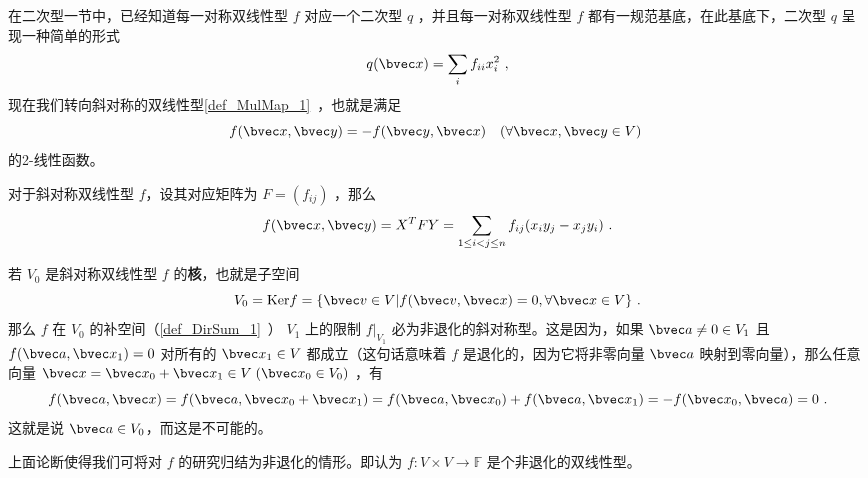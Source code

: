 
在二次型一节中，已经知道每一对称双线性型 $f$ 对应一个二次型 $q$ ，并且每一对称双线性型 $f$ 都有一规范基底，在此基底下，二次型 $q$ 呈现一种简单的形式
\begin{equation}
q(\bvec x)=\sum_{i}f_{ii}x_i^2~,
\end{equation}
现在我们转向斜对称的双线性型\autoref{def_MulMap_1}~，也就是满足 
\begin{equation}
f(\bvec x,\bvec y)=-f(\bvec y,\bvec x)\quad (\forall \bvec x,\bvec y\in V)~
\end{equation}
的2-线性函数。

对于斜对称双线性型 $f$，设其对应矩阵为 $F=(f_{ij})$ ，那么
\begin{equation}
f(\bvec x,\bvec y)=X^{T}FY=\sum_{1\leq i<j\leq n}f_{ij}(x_iy_j-x_jy_i)~.
\end{equation}

若 $V_0$ 是斜对称双线性型 $f$ 的\textbf{核}，也就是子空间
\begin{equation}
V_0=\mathrm{Ker} f=\{\bvec v\in V|f(\bvec v,\bvec x)=0,\forall\bvec x\in V\}~.
\end{equation}
那么 $f$ 在 $V_0$ 的补空间（\autoref{def_DirSum_1}~） $V_1$ 上的限制 $f|_{V_1}$ 必为非退化的斜对称型。这是因为，如果 $\bvec a\neq0\in V_1$ 且 $f(\bvec a,\bvec x_1)=0$ 对所有的 $\bvec x_1\in V$ 都成立（这句话意味着 $f$ 是退化的，因为它将非零向量 $\bvec a$ 映射到零向量），那么任意向量 $\bvec x=\bvec x_0+\bvec x_1\in V \;(\bvec x_0\in V_0)$ ，有
\begin{equation}
f(\bvec a,\bvec x)=f(\bvec a,\bvec x_0+\bvec x_1)=f(\bvec a,\bvec x_0)+f(\bvec a,\bvec x_1)=-f(\bvec x_0,\bvec a)=0~.
\end{equation}
 这就是说 $\bvec a\in V_0$，而这是不可能的。

 上面论断使得我们可将对 $f$ 的研究归结为非退化的情形。即认为 $f:V\times V\rightarrow\mathbb{F}$ 是个非退化的双线性型。

